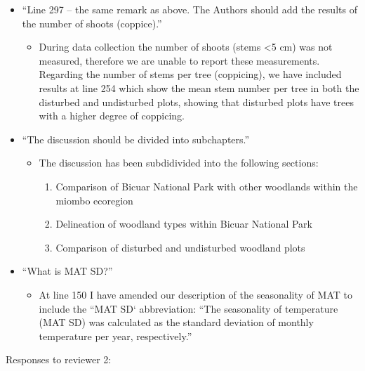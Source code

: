 \documentclass[a4paper]{letter}
\begin{document}
\begin{letter}{}
\begin{itemize}
\begin{itemize}
		\end{itemize}
	\item{``Line 297 – the same remark as above. The Authors should add the results of the number of shoots (coppice).''}
		\begin{itemize}
			\item{During data collection the number of shoots (stems \textless{}5 cm) was not measured, therefore we are unable to report these measurements. Regarding the number of stems per tree (coppicing), we have included results at line 254 which show the mean stem number per tree in both the disturbed and undisturbed plots, showing that disturbed plots have trees with a higher degree of coppicing.}
		\end{itemize}
	\item{``The discussion should be divided into subchapters.''}
		\begin{itemize}
			\item{The discussion has been subdidivided into the following sections:}
				\begin{enumerate}
					\item{Comparison of Bicuar National Park with other woodlands within the miombo ecoregion}
					\item{Delineation of woodland types within Bicuar National Park}
					\item{Comparison of disturbed and undisturbed woodland plots}
				\end{enumerate}
		\end{itemize}
	\item{``What is MAT SD?''}
			\begin{itemize}
				\item{At line 150 I have amended our description of the seasonality of MAT to include the ``MAT SD` abbreviation: ``The seasonality of temperature (MAT SD) was calculated as the standard deviation of monthly temperature per year, respectively.''}
			\end{itemize}
\end{itemize}

\newpage{}
Responses to reviewer 2:


\end{letter}
\end{document}
